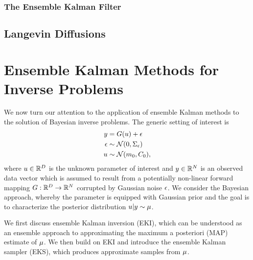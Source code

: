 \documentclass[12pt]{article}
\begin{document}
\subsubsection{The Ensemble Kalman Filter}


\subsection{Langevin Diffusions}

\section{Ensemble Kalman Methods for Inverse Problems}
We now turn our attention to the application of ensemble Kalman methods to the solution of Bayesian inverse problems. 
The generic setting of interest is 
\begin{align}
y &= G(u) + \epsilon \label{inverse_problem} \\
\epsilon &\sim \mathcal{N}(0, \Sigma_{\epsilon}) \nonumber \\
u &\sim \mathcal{N}(m_0, C_0), \nonumber
\end{align}
where $u \in \mathbb{R}^{D}$ is the unknown parameter of interest and $y \in \mathbb{R}^{N}$ is an observed 
data vector which is assumed to result from a potentially non-linear forward mapping $G: \mathbb{R}^{D} \to \mathbb{R}^{N}$
corrupted by Gaussian noise $\epsilon$. We consider the Bayesian approach, whereby the parameter is equipped with 
Gaussian prior and the goal is to characterize the posterior distribution $u|y \sim \mu$. 

We first discuss ensemble Kalman inversion (EKI), which can be understood as an ensemble approach to approximating the 
maximum a posteriori (MAP) estimate of $\mu$. We then build on EKI and introduce the ensemble Kalman sampler (EKS), 
which produces approximate samples from $\mu$.  
\end{document}
